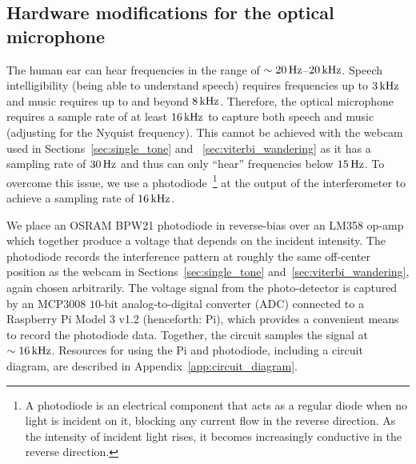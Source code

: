 \documentclass[paper-main.tex]{subfiles}
\begin{document}
\subsection{Hardware modifications for the optical microphone}
\label{sec:photodiode}
The human ear can hear frequencies in the range of $\sim 20\,{\rm Hz}$--$20\,{\rm kHz}$. 
Speech intelligibility (being able to understand speech) requires frequencies up to $3\,{\rm kHz}$ and music requires up to and beyond $8\,{\rm kHz}$. 
Therefore, the optical microphone requires a sample rate of at least $16\,{\rm kHz}$ to capture both speech and music (adjusting for the Nyquist frequency). 
This cannot be achieved with the webcam used in Sections~\ref{sec:single_tone} and ~\ref{sec:viterbi_wandering} as it has a sampling rate of $30\,{\rm Hz}$ and thus can only ``hear'' frequencies below $15\,{\rm Hz}$.
To overcome this issue, we use a photodiode~\footnote{A photodiode is an electrical component that acts as a regular diode when no light is incident on it, blocking any current flow in the reverse direction. As the intensity of incident light rises, it becomes increasingly conductive in the reverse direction.} at the output of the interferometer to achieve a sampling rate of $16\,{\rm kHz}$.

We place an OSRAM BPW21 photodiode in reverse-bias over an LM358 op-amp which together produce a voltage that depends on the incident intensity. 
The photodiode records the interference pattern at roughly the same off-center position as the webcam in Sections~\ref{sec:single_tone} and~\ref{sec:viterbi_wandering}, again chosen arbitrarily.
The voltage signal from the photo-detector is captured by an MCP3008 $10$-bit analog-to-digital converter (ADC) connected to a Raspberry Pi Model 3 v1.2 (henceforth: Pi), which provides a convenient means to record the photodiode data.
Together, the circuit samples the signal at $\sim 16\,{\rm kHz}$. 
Resources for using the Pi and photodiode, including a circuit diagram, are described in Appendix~\ref{app:circuit_diagram}.
\end{document}
